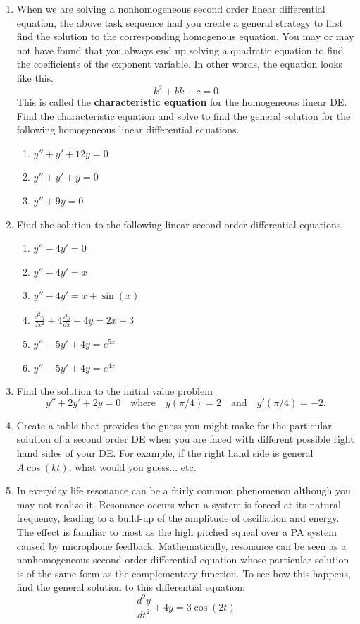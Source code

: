 \begin{enumerate}
\item When we are solving a nonhomogeneous second order linear differential equation, the above task sequence had you create a general strategy to first find the solution to the corresponding homogenous equation. You may or may not have found that you always end up solving a quadratic equation to find the coefficients of the exponent variable. In other words, the equation looks like this.
\[
k^2+bk+c=0
\]              
This is called the \textbf{characteristic equation} for the homogeneous linear DE.
Find the characteristic equation and solve to find the general solution for the following homogeneous linear differential equations. \label{07HWproblem1}
\begin{enumerate}
\item $y'' + y' + 12y = 0$
\item $y'' + y' + y = 0$
\item $y'' + 9y = 0$
\end{enumerate} 

\item Find the solution to the following linear second order differential equations. \label{07HWproblem2}
\begin{enumerate}
\item $y'' -4y' = 0$
\item $y'' -4y' = x$
\item $y'' -4y' = x + \sin(x)$
\item $\displaystyle\frac{d^2y}{dx^2}+4\frac{dy}{dx}+4y=2x+3$
\item $y'' - 5y' + 4y = e^{5x}$
\item $y'' - 5y' + 4y = e^{4x}$
\end{enumerate}

\item Find the solution to the initial value problem \label{07HWproblem3}
\[
y''+2y'+2y=0 \quad \text{where} \quad y(\pi/4)=2 \quad \text{and} \quad y'(\pi/4)=-2.
\]

\item Create a table that provides the guess you might make for the particular solution of a second order DE when you are faced with different possible right hand sides of your DE. For example, if the right hand side is general $A\cos(kt)$, what would you guess... etc. \label{07HWproblem4}

\item In everyday life resonance can be a fairly common phenomenon although you may not realize it. Resonance occurs when a system is forced at its natural frequency, leading to a build-up of the amplitude of oscillation and energy. The effect is familiar to most as the high pitched squeal over a PA system caused by microphone feedback. Mathematically, resonance can be seen as a nonhomogeneous second order differential equation whose particular solution is of the same form as the complementary function. To see how this happens, find the general solution to this differential equation: \label{07HWproblem5}
\[
\frac{d^2y}{dt^2}+4y=3\cos(2t)
\]


\end{enumerate}

